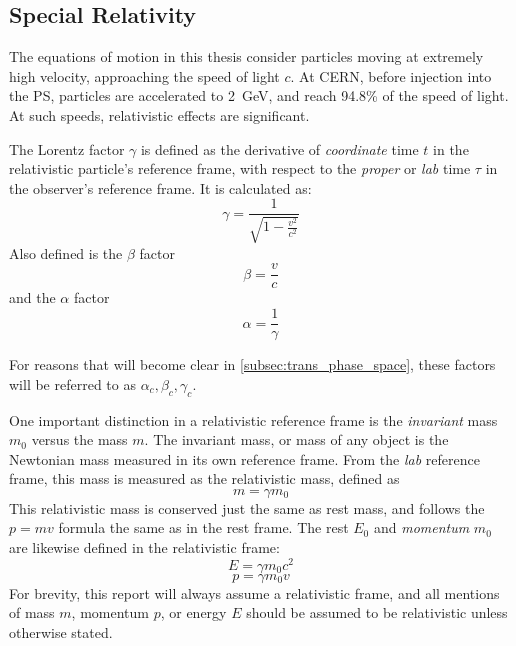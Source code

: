 \documentclass[11pt]{report}
\begin{document}
\subsection{Special Relativity}

The equations of motion in this thesis consider particles moving at extremely high velocity, approaching the speed of light $c$. At CERN, before injection into the PS, particles are accelerated to \qty{2}{\giga\electronvolt}, and reach 94.8\% of the speed of light. At such speeds, relativistic effects are significant.

The Lorentz factor $\gamma$ is defined as the derivative of \textit{coordinate} time $t$ in the relativistic particle's reference frame, with respect to the \textit{proper} or \textit{lab} time $\tau$ in the observer's reference frame. It is calculated as:
\begin{equation}
    \gamma = \frac 1{\sqrt{1-\frac{v^2}{c^2}}}
\end{equation}
Also defined is the $\beta$ factor
\begin{equation}
    \beta = \frac vc
\end{equation}
and the $\alpha$ factor
\begin{equation}
    \alpha = \frac 1\gamma
\end{equation}

For reasons that will become clear in \autoref{subsec:trans_phase_space}, these factors will be referred to as $\alpha_c, \beta_c, \gamma_c$.

One important distinction in a relativistic reference frame is the \textit{invariant} mass $m_0$ versus the  mass $m$. The invariant mass, or  mass of any object is the Newtonian mass measured in its own reference frame. From the \textit{lab} reference frame, this mass is measured as the relativistic mass, defined as
\begin{equation}
    m=\gamma m_0
\end{equation}
This relativistic mass is conserved just the same as rest mass, and follows the $p=mv$ formula the same as in the rest frame. 
The rest  $E_0$ and \textit{momentum} $m_0$ are likewise defined in the relativistic frame:
\begin{equation}
    E=\gamma m_0c^2
\end{equation}
\begin{equation}
    p=\gamma m_0v
\end{equation}
For brevity, this report will always assume a relativistic frame, and all mentions of mass $m$, momentum $p$, or energy $E$ should be assumed to be relativistic unless otherwise stated.
\end{document}
